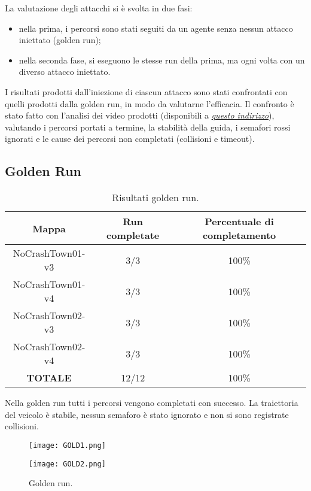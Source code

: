 La valutazione degli attacchi si è svolta in due fasi:\begin{itemize}
    \item nella prima, i percorsi sono stati seguiti da un agente senza nessun attacco iniettato (golden run);
    \item nella seconda fase, si eseguono le stesse run della prima, ma ogni volta con un diverso attacco iniettato.
\end{itemize}
I risultati prodotti dall'iniezione di ciascun attacco sono stati confrontati con quelli prodotti dalla golden run, in modo da valutarne l'efficacia.
Il confronto è stato fatto con l'analisi dei video prodotti (disponibili a \href{https://drive.google.com/drive/folders/1tTEAQSK2XAK_sdmuWo80Bd-58_pkiK3h?usp=sharing}{\emph{questo indirizzo}}), valutando i percorsi portati a termine,  la stabilità della guida, i semafori rossi ignorati e le cause dei percorsi
non completati (collisioni e timeout).
\subsection{Golden Run}
\begin{table}[h]
    \begin{tabular}{|c|c|c|}
        \hline
        Mappa                   & Run completate & Percentuale di completamento\\
        \hline
        NoCrashTown01-v3        & 3/3            & 100\% \\
        NoCrashTown01-v4        & 3/3            & 100\% \\
        NoCrashTown02-v3        & 3/3            & 100\% \\
        NoCrashTown02-v4        & 3/3            & 100\%  \\
        \hline
        \textbf{TOTALE}                  & 12/12          & 100\% \\
        \hline
    \end{tabular}
    \caption{Risultati golden run.}
Nella golden run tutti i percorsi vengono completati con successo. La traiettoria del veicolo è stabile, nessun semaforo è stato ignorato e non si sono registrate collisioni.
\end{table}
\begin{figure}[h!]
    \centering
    \parbox{6cm}{
    \texttt{[image: GOLD1.png]}
    \label{fig:gold1}}
    \qquad
    \begin{minipage}{6cm}
    \texttt{[image: GOLD2.png]}
    \label{fig:gold2}
    \end{minipage}
    \caption{Golden run.}
    \label{fig:goldrun}
    \end{figure}
\newpage
